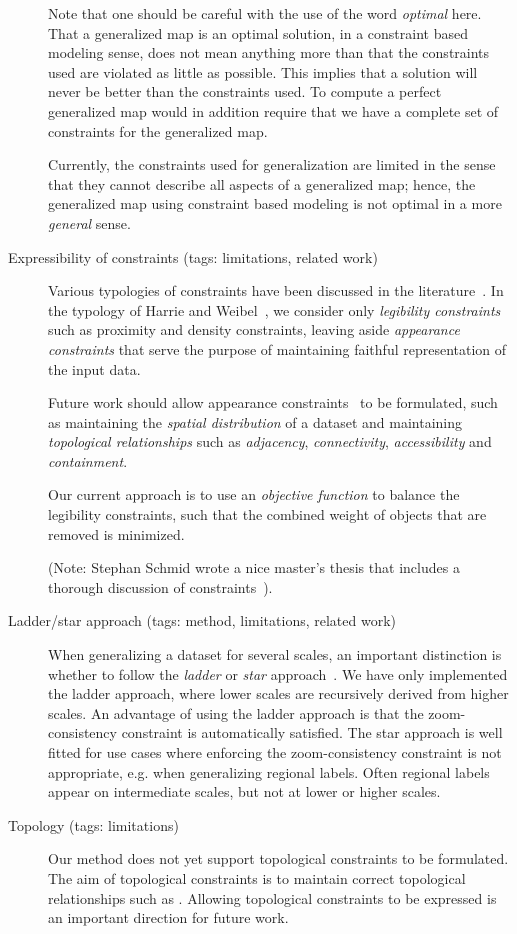 \documentclass[11pt, oneside]{article}   	%
\begin{document}
\begin{description}
Note that one should be careful with the use of the word \emph{optimal} here. That a generalized map is an optimal solution, in a constraint based modeling sense, does not mean anything more than that the constraints used are violated as little as possible. This implies that a solution will never be better than the constraints used. To compute a perfect generalized map would in addition require that we have a complete set of constraints for the generalized map. 

Currently, the constraints used for generalization are limited in the sense that they cannot describe all aspects of a generalized map; hence, the generalized map using constraint based modeling is not optimal in a more \emph{general} sense.

\item[Expressibility of constraints (tags: limitations, related work)] Various typologies of constraints have been discussed in the literature~\cite{beard1991constraints,harrie2007modelling}. In the typology of Harrie and Weibel~\cite{harrie2007modelling}, we consider only \emph{legibility constraints} such as proximity and density constraints, leaving aside \emph{appearance constraints} that serve the purpose of maintaining faithful representation of the input data. 

Future work should allow appearance constraints~\cite{harrie2007modelling} to be formulated, such as maintaining the \emph{spatial distribution} of a dataset and maintaining \emph{topological relationships} such as \emph{adjacency}, \emph{connectivity}, \emph{accessibility} and \emph{containment}.

Our current approach is to use an \emph{objective function} to balance the legibility constraints, such that the combined weight of objects that are removed is minimized. 

(Note: Stephan Schmid wrote a nice master's thesis that includes a thorough discussion of constraints~\cite{schmid2008automated}).

\item[Ladder/star approach (tags: method, limitations, related work)] When generalizing a dataset for several scales, an important distinction is whether to follow the \emph{ladder} or \emph{star} approach~\cite{foerster2010challenges}. We have only implemented the ladder approach, where lower scales are recursively derived from higher scales. An advantage of using the ladder approach is that the zoom-consistency constraint is automatically satisfied. The star approach is well fitted for use cases where enforcing the zoom-consistency constraint is not appropriate, e.g. when generalizing regional labels. Often regional labels appear on intermediate scales, but not at lower or higher scales.

\item[Topology (tags: limitations)] Our method does not yet support topological constraints to be formulated. The aim of topological constraints is to maintain correct topological relationships such as . Allowing topological constraints to be expressed is an important direction for future work.

\end{description}
\end{document}
